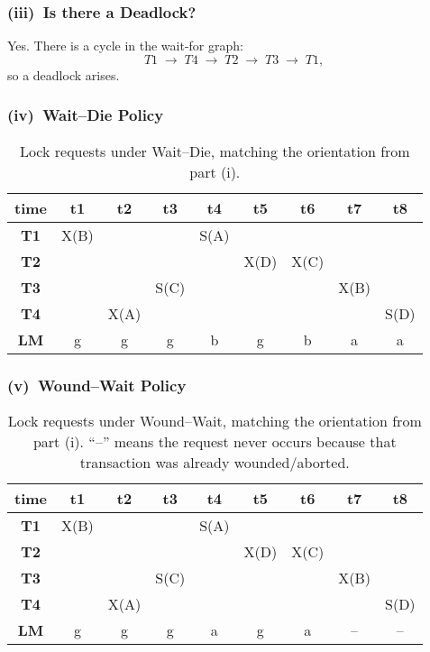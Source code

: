 \documentclass[11pt]{article}
\begin{document}
\subsubsection*{(iii)~Is there a Deadlock?}
Yes. There is a cycle in the wait-for graph:
\[
T1 \;\rightarrow\; T4 \;\rightarrow\; T2 \;\rightarrow\; T3 \;\rightarrow\; T1,
\]
so a deadlock arises.

\newpage
\subsubsection*{(iv)~Wait--Die Policy}
\begin{table}[!htbp]
\centering
\begin{tabular}{c|cccccccc}
\textbf{time}
  & \textbf{t1} 
  & \textbf{t2} 
  & \textbf{t3} 
  & \textbf{t4} 
  & \textbf{t5} 
  & \textbf{t6} 
  & \textbf{t7}
  & \textbf{t8} \\
\hline
\textbf{T1}
  & X(B) &      &      & S(A) &      &      &      &      \\
\textbf{T2}
  &      &      &      &      & X(D) & X(C) &      &      \\
\textbf{T3}
  &      &      & S(C) &      &      &      & X(B) &      \\
\textbf{T4}
  &      & X(A) &      &      &      &      &      & S(D) \\
\hline
\textbf{LM}
  & g    & g    & g    & b    & g    & b    & a    & a    \\
\end{tabular}
\caption{Lock requests under Wait--Die, matching the orientation from part (i).}
\end{table}

\subsubsection*{(v)~Wound--Wait Policy}
\begin{table}[!htbp]
\centering
\begin{tabular}{c|cccccccc}
\textbf{time}
  & \textbf{t1} 
  & \textbf{t2} 
  & \textbf{t3} 
  & \textbf{t4} 
  & \textbf{t5} 
  & \textbf{t6} 
  & \textbf{t7}
  & \textbf{t8} \\
\hline
\textbf{T1}
  & X(B) &      &      & S(A) &      &      &      &      \\
\textbf{T2}
  &      &      &      &      & X(D) & X(C) &      &      \\
\textbf{T3}
  &      &      & S(C) &      &      &      & X(B) &      \\
\textbf{T4}
  &      & X(A) &      &      &      &      &      & S(D) \\
\hline
\textbf{LM}
  & g    & g    & g    & a    & g    & a    & --   & --   \\
\end{tabular}
\caption{Lock requests under Wound--Wait, matching the orientation from part (i). 
``--'' means the request never occurs because that transaction was already wounded/aborted.}
\end{table}

\end{document}
